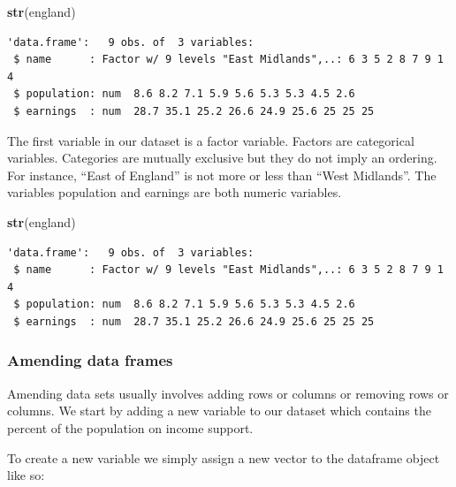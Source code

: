 \documentclass[]{article}
\newenvironment{Shaded}{\begin{snugshade}}{\end{snugshade}}
\newcommand{\DecValTok}[1]{\textcolor[rgb]{0.00,0.00,0.81}{#1}}
\newcommand{\FloatTok}[1]{\textcolor[rgb]{0.00,0.00,0.81}{#1}}
\newcommand{\KeywordTok}[1]{\textcolor[rgb]{0.13,0.29,0.53}{\textbf{#1}}}
\newcommand{\NormalTok}[1]{#1}
\newcommand{\OperatorTok}[1]{\textcolor[rgb]{0.81,0.36,0.00}{\textbf{#1}}}
\newcommand{\StringTok}[1]{\textcolor[rgb]{0.31,0.60,0.02}{#1}}
\begin{document}
\begin{Shaded}
\begin{Highlighting}[]
\KeywordTok{str}\NormalTok{(england)}
\end{Highlighting}
\end{Shaded}

\begin{verbatim}
'data.frame':   9 obs. of  3 variables:
 $ name      : Factor w/ 9 levels "East Midlands",..: 6 3 5 2 8 7 9 1 4
 $ population: num  8.6 8.2 7.1 5.9 5.6 5.3 5.3 4.5 2.6
 $ earnings  : num  28.7 35.1 25.2 26.6 24.9 25.6 25 25 25
\end{verbatim}

The first variable in our dataset is a factor variable. Factors are categorical variables. Categories are mutually exclusive but they do not imply an ordering. For instance, ``East of England'' is not more or less than ``West Midlands''. The variables population and earnings are both numeric variables.

\begin{Shaded}
\begin{Highlighting}[]
\KeywordTok{str}\NormalTok{(england)}
\end{Highlighting}
\end{Shaded}

\begin{verbatim}
'data.frame':   9 obs. of  3 variables:
 $ name      : Factor w/ 9 levels "East Midlands",..: 6 3 5 2 8 7 9 1 4
 $ population: num  8.6 8.2 7.1 5.9 5.6 5.3 5.3 4.5 2.6
 $ earnings  : num  28.7 35.1 25.2 26.6 24.9 25.6 25 25 25
\end{verbatim}

\hypertarget{amending-data-frames}{%
\subsubsection{Amending data frames}\label{amending-data-frames}}

Amending data sets usually involves adding rows or columns or removing rows or columns. We start by adding a new variable to our dataset which contains the percent of the population on income support.

To create a new variable we simply assign a new vector to the dataframe object like so:

\begin{Shaded}
\end{Shaded}
\end{document}
